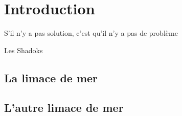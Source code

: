 \chapter{Introduction}

\epigraph{S'il n'y a pas solution, c'est qu'il n'y a pas de problème}{Les Shadoks}

\lipsum[1-8]

\section{La limace de mer}

\lipsum[2-8]

\section{L'autre limace de mer}

